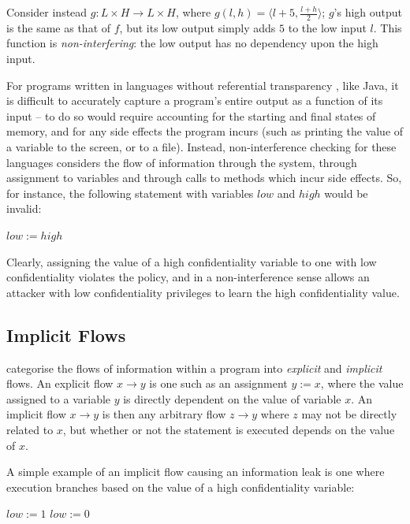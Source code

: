 Consider instead $ g: L \times H \rightarrow L \times H $, where $ g(l, h) = \langle l + 5, \frac{l + h}{2} \rangle $; $ g $'s high output is the same as that of $ f $, but its low output simply adds $ 5 $ to the low input $ l $. This function is \textit{non-interfering}: the low output has no dependency upon the high input.

For programs written in languages without referential transparency \cite{sondergaard1990reftrans}, like Java, it is difficult to accurately capture a program's entire output as a function of its input -- to do so would require accounting for the starting and final states of memory, and for any side effects the program incurs (such as printing the value of a variable to the screen, or to a file). Instead, non-interference checking for these languages considers the flow of information through the system, through assignment to variables and through calls to methods which incur side effects. So, for instance, the following statement with variables $ low $ and $ high $ would be invalid:

\begin{algorithmic}
\State $ low := high $
\end{algorithmic}

Clearly, assigning the value of a high confidentiality variable to one with low confidentiality violates the policy, and in a non-interference sense allows an attacker with low confidentiality privileges to learn the high confidentiality value.

\subsection{Implicit Flows}

\citeauthor{denning1977certification} \cite{denning1977certification} categorise the flows of information within a program into \textit{explicit} and \textit{implicit} flows. An explicit flow $ x \rightarrow y $ is one such as an assignment $ y := x $, where the value assigned to a variable $ y $ is directly dependent on the value of variable $ x $. An implicit flow $ x \rightarrow y $ is then any arbitrary flow $ z \rightarrow y $ where $ z $ may not be directly related to $ x $, but whether or not the statement is executed depends on the value of $ x $.

A simple example of an implicit flow causing an information leak is one where execution branches based on the value of a high confidentiality variable:

\begin{algorithmic}
		\State $ low := 1 $
	\Else
		\State $ low := 0 $
	\EndIf
\end{algorithmic}

